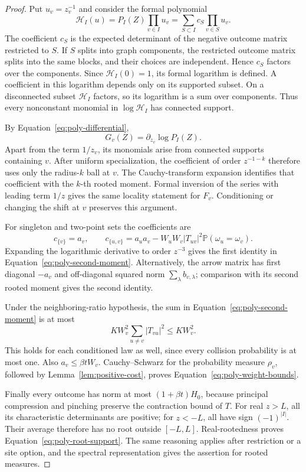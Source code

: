 \begin{proof}
Put \(u_v=z_v^{-1}\) and consider the formal polynomial
\[
 \mathcal H_I(u)=P_I(Z)\prod_{v\in I}u_v
           =\sum_{S\subset I}c_S\prod_{v\in S}u_v.
\]
The coefficient \(c_S\) is the expected determinant of the negative
outcome matrix restricted to \(S\).  If \(S\) splits into graph
components, the restricted outcome matrix splits into the same blocks,
and their choices are independent.  Hence \(c_S\) factors over the
components.  Since \(\mathcal H_I(0)=1\), its formal logarithm is
defined.  A coefficient in this logarithm depends only on its supported
subset.  On a disconnected subset \(\mathcal H_I\) factors, so its
logarithm is a sum over components.  Thus every nonconstant monomial
in \(\log\mathcal H_I\) has connected support.

By Equation~\eqref{eq:poly-differential},
\[
                   G_v(Z)=\partial_{z_v}\log P_I(Z).
\]
Apart from the term \(1/z_v\), its monomials arise from connected
supports containing \(v\).  After uniform specialization, the
coefficient of order \(z^{-1-k}\) therefore uses only the radius-\(k\)
ball at \(v\).  The Cauchy-transform expansion identifies that coefficient
with the \(k\)-th rooted moment.  Formal inversion of the series with
leading term \(1/z\) gives the same locality statement for \(F_v\).
Conditioning or changing the shift at \(v\) preserves this argument.

For singleton and two-point sets the coefficients are
\[
 c_{\{v\}}=a_v,\qquad
 c_{\{u,v\}}=a_ua_v-W_uW_v|T_{uv}|^2
                         \mathbb P(\omega_u=\omega_v).
\]
Expanding the logarithmic derivative to order \(z^{-3}\) gives the
first identity in Equation~\eqref{eq:poly-second-moment}.
Alternatively, the arrow matrix has first diagonal \(-a_v\) and
off-diagonal squared norm \(\sum_\lambda b_{v,\lambda}\); comparison
with its second rooted moment gives the second identity.

Under the neighboring-ratio hypothesis, the sum in
Equation~\eqref{eq:poly-second-moment} is at most
\[
 K W_v^2\sum_{u\ne v}|T_{vu}|^2\leq K W_v^2.
\]
This holds for each conditioned law as well, since every collision
probability is at most one.  Also \(a_v\leq\beta tW_v\).
Cauchy--Schwarz for the probability measure \(\rho_v\), followed by
Lemma~\ref{lem:positive-cost}, proves
Equation~\eqref{eq:poly-weight-bounds}.

Finally every outcome has norm at most \((1+\beta t)H_0\), because
principal compression and pinching preserve the contraction bound of
\(T\).  For real \(z>L\), all its characteristic determinants are
positive; for \(z<-L\), all have sign \((-1)^{|I|}\).
Their average therefore has no root outside \([-L,L]\).
Real-rootedness proves Equation~\eqref{eq:poly-root-support}.
The same reasoning applies after restriction or a site option, and
the spectral representation gives the assertion for rooted measures.
\end{proof}

